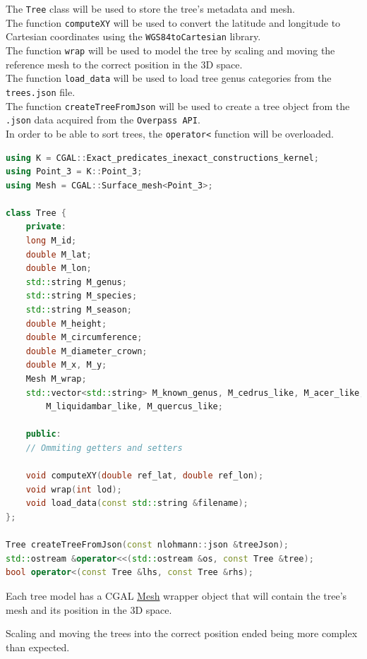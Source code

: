 \documentclass[12pt]{article}
\begin{document}
The \texttt{Tree} class will be used to store the tree's metadata and mesh. \\
The function \texttt{computeXY} will be used to convert the latitude and longitude
to Cartesian coordinates using the \texttt{WGS84toCartesian} library. \\
The function \texttt{wrap} will be used to model the tree by scaling and moving
the reference mesh to the correct position in the 3D space. \\
The function \texttt{load\_data} will be used to load tree genus categories from
the \texttt{trees.json} file. \\
The function \texttt{createTreeFromJson} will be used to create a tree object from
the \texttt{.json} data acquired from the \texttt{Overpass API}. \\
In order to be able to sort trees, the \texttt{operator<} function will be overloaded.


\begin{lstlisting}[language=C++]
using K = CGAL::Exact_predicates_inexact_constructions_kernel;
using Point_3 = K::Point_3;
using Mesh = CGAL::Surface_mesh<Point_3>;

class Tree {
    private:
    long M_id;
    double M_lat;
    double M_lon;
    std::string M_genus;
    std::string M_species;
    std::string M_season;
    double M_height;
    double M_circumference;
    double M_diameter_crown;
    double M_x, M_y;
    Mesh M_wrap;
    std::vector<std::string> M_known_genus, M_cedrus_like, M_acer_like,
        M_liquidambar_like, M_quercus_like;

    public:
    // Ommiting getters and setters

    void computeXY(double ref_lat, double ref_lon);
    void wrap(int lod);
    void load_data(const std::string &filename);
};

Tree createTreeFromJson(const nlohmann::json &treeJson);
std::ostream &operator<<(std::ostream &os, const Tree &tree);
bool operator<(const Tree &lhs, const Tree &rhs);
\end{lstlisting}

Each tree model has a CGAL \href{https://doc.cgal.org/latest/Surface_mesh/classCGAL_1_1Surface__mesh.html}{Mesh}
wrapper object that will contain the tree's
mesh and its position in the 3D space.

Scaling and moving the trees into the correct position ended being more complex
than expected.
\end{document}
